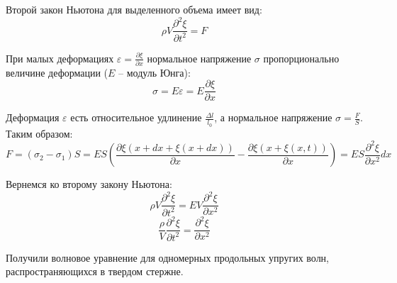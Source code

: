 \documentclass{article}
\begin{document}
	Второй закон Ньютона для выделенного объема имеет вид:
	\begin{equation}
		\rho V \frac{\partial^2 \xi}{\partial t^2} = F
	\end{equation}

	При малых деформациях $\varepsilon = \frac{\partial \xi}{\partial x}$ нормальное напряжение $\sigma$ пропорционально величине деформации ($E$ -- модуль Юнга):
	\begin{equation}
		\sigma = E\varepsilon = E\frac{\partial \xi}{\partial x}
	\end{equation}

	Деформация $\varepsilon$ есть относительное удлинение $\frac{\Delta l}{l_0}$, а нормальное напряжение $\sigma = \frac{F}{S}$. Таким образом:
	\begin{equation}
		F =(\sigma_2-\sigma_1) S = ES(\frac{\partial\xi(x+dx+\xi(x+dx))}{\partial x} - \frac{\partial\xi(x+\xi(x,t))}{\partial x}) = ES\frac{\partial^2 \xi}{\partial x^2}dx
	\end{equation}

	Вернемся ко второму закону Ньютона:
	\begin{equation}
		\rho V \frac{\partial^2 \xi}{\partial t^2} = EV\frac{\partial^2 \xi}{\partial x^2}
	\end{equation}
	\begin{equation}
		\frac{\rho}{V} \frac{\partial^2 \xi}{\partial t^2} = \frac{\partial^2 \xi}{\partial x^2}
	\end{equation}

	Получили волновое уравнение для одномерных продольных упругих волн, распространяющихся в твердом стержне.
\end{document}
